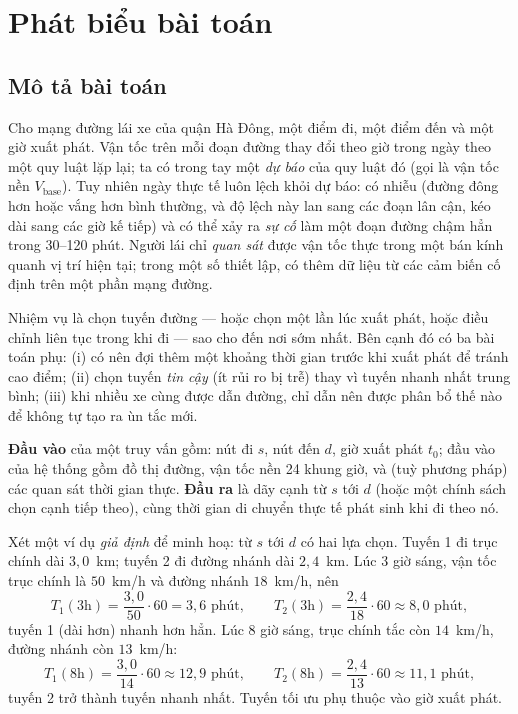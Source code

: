 \section{Phát biểu bài toán}\label{sec:problem}

\subsection{Mô tả bài toán}\label{sec:problem:desc}

Cho mạng đường lái xe của quận Hà Đông, một điểm đi, một điểm đến và một giờ xuất phát. Vận tốc trên mỗi đoạn đường
thay đổi theo giờ trong ngày theo một quy luật lặp lại; ta có trong tay một \emph{dự báo} của quy luật đó (gọi là vận
tốc nền $V_{\text{base}}$). Tuy nhiên ngày thực tế luôn lệch khỏi dự báo: có nhiễu (đường đông hơn hoặc vắng hơn bình
thường, và độ lệch này lan sang các đoạn lân cận, kéo dài sang các giờ kế tiếp) và có thể xảy ra \emph{sự cố} làm một
đoạn đường chậm hẳn trong 30--120 phút. Người lái chỉ \emph{quan sát} được vận tốc thực trong một bán kính quanh vị trí
hiện tại; trong một số thiết lập, có thêm dữ liệu từ các cảm biến cố định trên một phần mạng đường.

Nhiệm vụ là chọn tuyến đường --- hoặc chọn một lần lúc xuất phát, hoặc điều chỉnh liên tục trong khi đi --- sao cho đến
nơi sớm nhất. Bên cạnh đó có ba bài toán phụ: (i) có nên đợi thêm một khoảng thời gian trước khi xuất phát để tránh
cao điểm; (ii) chọn tuyến \emph{tin cậy} (ít rủi ro bị trễ) thay vì tuyến nhanh nhất trung bình; (iii) khi nhiều xe
cùng được dẫn đường, chỉ dẫn nên được phân bổ thế nào để không tự tạo ra ùn tắc mới.

\textbf{Đầu vào} của một truy vấn gồm: nút đi $s$, nút đến $d$, giờ xuất phát $t_0$; đầu vào của hệ thống gồm đồ thị
đường, vận tốc nền 24 khung giờ, và (tuỳ phương pháp) các quan sát thời gian thực. \textbf{Đầu ra} là dãy cạnh từ $s$ tới
$d$ (hoặc một chính sách chọn cạnh tiếp theo), cùng thời gian di chuyển thực tế phát sinh khi đi theo nó.

\begin{vd}\label{vd:toy}
Xét một ví dụ \emph{giả định} để minh hoạ: từ $s$ tới $d$ có hai lựa chọn. Tuyến 1 đi trục chính dài $3{,}0$~km; tuyến 2
đi đường nhánh dài $2{,}4$~km. Lúc 3 giờ sáng, vận tốc trục chính là $50$~km/h và đường nhánh $18$~km/h, nên
\begin{equation}
T_1(3\text{h}) = \frac{3{,}0}{50}\cdot 60 = 3{,}6 \text{ phút}, \qquad
T_2(3\text{h}) = \frac{2{,}4}{18}\cdot 60 \approx 8{,}0 \text{ phút},
\label{eq:toy3}
\end{equation}
tuyến 1 (dài hơn) nhanh hơn hẳn. Lúc 8 giờ sáng, trục chính tắc còn $14$~km/h, đường nhánh còn $13$~km/h:
\begin{equation}
T_1(8\text{h}) = \frac{3{,}0}{14}\cdot 60 \approx 12{,}9 \text{ phút}, \qquad
T_2(8\text{h}) = \frac{2{,}4}{13}\cdot 60 \approx 11{,}1 \text{ phút},
\label{eq:toy8}
\end{equation}
tuyến 2 trở thành tuyến nhanh nhất. Tuyến tối ưu phụ thuộc vào giờ xuất phát.
\end{vd}

